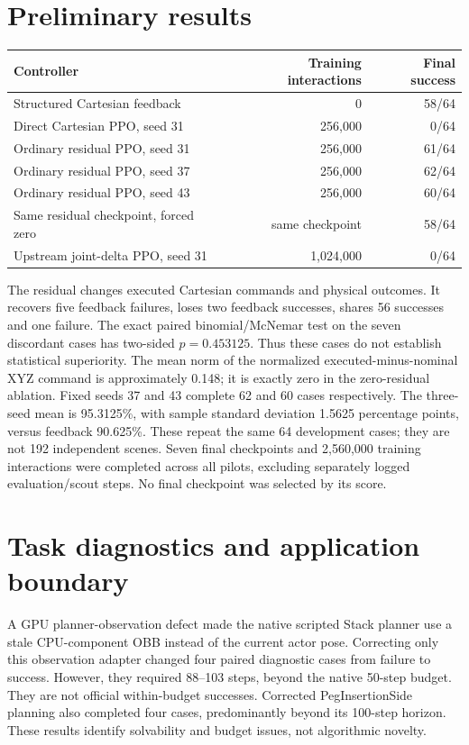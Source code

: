 \documentclass[10pt,a4paper]{article}
\begin{document}
\section{Preliminary results}
\begin{center}
\begin{tabular}{lrr}
\toprule
Controller & Training interactions & Final success \\
\midrule
Structured Cartesian feedback & 0 & 58/64 \\
Direct Cartesian PPO, seed 31 & 256,000 & 0/64 \\
Ordinary residual PPO, seed 31 & 256,000 & 61/64 \\
Ordinary residual PPO, seed 37 & 256,000 & 62/64 \\
Ordinary residual PPO, seed 43 & 256,000 & 60/64 \\
Same residual checkpoint, forced zero & same checkpoint & 58/64 \\
Upstream joint-delta PPO, seed 31 & 1,024,000 & 0/64 \\
\bottomrule
\end{tabular}
\end{center}
The residual changes executed Cartesian commands and physical outcomes. It
recovers five feedback failures, loses two feedback successes, shares 56
successes and one failure. The exact paired binomial/McNemar test on the seven
discordant cases has two-sided $p=0.453125$. Thus these cases do not establish
statistical superiority. The mean norm of the normalized executed-minus-nominal
XYZ command is approximately 0.148; it is exactly zero in the zero-residual
ablation. Fixed seeds 37 and 43 complete 62 and 60 cases respectively. The
three-seed mean is 95.3125\%, with sample standard deviation 1.5625 percentage
points, versus feedback 90.625\%. These repeat the same 64 development cases;
they are not 192 independent scenes. Seven final checkpoints and 2,560,000
training interactions were completed across all pilots, excluding separately
logged evaluation/scout steps. No final checkpoint was selected by its score.

\section{Task diagnostics and application boundary}
A GPU planner-observation defect made the native scripted Stack planner use a
stale CPU-component OBB instead of the current actor pose. Correcting only this
observation adapter changed four paired diagnostic cases from failure to success.
However, they required 88--103 steps, beyond the native 50-step budget. They are
not official within-budget successes. Corrected PegInsertionSide planning also
completed four cases, predominantly beyond its 100-step horizon. These results
identify solvability and budget issues, not algorithmic novelty.
\end{document}
